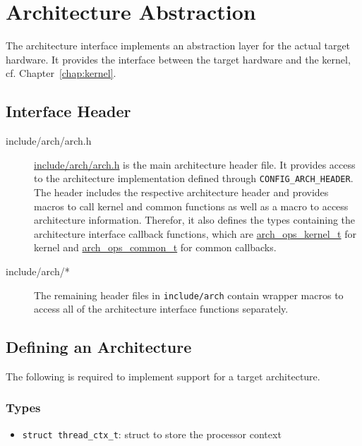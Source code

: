 %
%
%



\chapter{Architecture Abstraction\label{chap:arch}}
	The architecture interface implements an abstraction layer for the actual target hardware. It provides the interface between the target hardware and the kernel, cf. Chapter~\ref{chap:kernel}.


\section{Interface Header}
	\begin{description}
	\item[include/arch/arch.h]
		\hyperref[arch_8h]{include/arch/arch.h} is the main architecture header file. It provides access to the architecture implementation defined through \lstinline{CONFIG_ARCH_HEADER}. The header includes the respective architecture header and provides macros to call kernel and common functions as well as a macro to access architecture information. Therefor, it also defines the types containing the architecture interface callback functions, which are \hyperref[structarch__ops__kernel__t]{arch\_ops\_kernel\_t} for kernel and \hyperref[structarch__ops__common__t]{arch\_ops\_common\_t} for common callbacks.

	\item[include/arch/*]
		The remaining header files in \lstinline{include/arch} contain wrapper macros to access all of the architecture interface functions separately.
	\end{description}


\section{Defining an Architecture}
	The following is required to implement support for a target architecture.

	\subsection{Types}
		\begin{itemize}
			\item \lstinline{struct thread_ctx_t}: struct to store the processor context
		\end{itemize}

